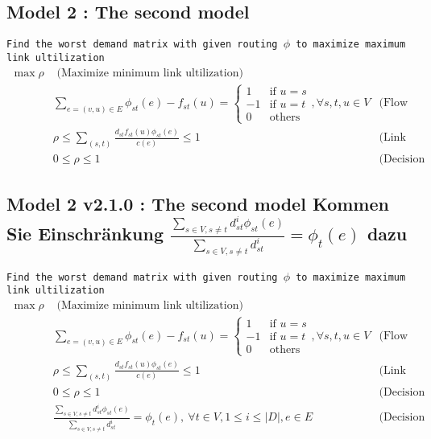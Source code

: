 \documentclass{ctexart}
\begin{document}
\subsection{Model 2 : The second model}
\texttt{Find the worst demand matrix with given routing $\phi$  to maximize maximum link ultilization} 
\begin{equation}
	\begin{aligned}
		\max \rho & \text{  (Maximize minimum link ultilization)}\\
		& \sum_{e=(v,u)\in E}\phi_{st}(e)-f_{st}(u)=\begin{cases}
			1 &\text{if } u=s \\
			-1 &\text{if } u=t \\
			0 &\text{others} 
		 \end{cases},\forall s,t,u\in V & \text{(Flow conservation)}\\
		& \rho\leq\sum_{(s,t)}\frac{
			d_{st}f_{st}(u)\phi_{st}(e)}{c(e)} \leq 1\ &  \text{(Link capacity constraint)} \\
		& 0\leq\rho\leq1\ & \text{(Decision variable constraint)}
	\end{aligned}
\end{equation}

\subsection{Model 2 v2.1.0 : The second model Kommen Sie Einschränkung $\frac{\sum_{s\in V,s\not=t}d_{st}^i\phi_{st}(e)}{\sum_{s\in V,s\not=t}d_{st}^i}=\phi_t(e)$ dazu}
\texttt{Find the worst demand matrix with given routing $\phi$  to maximize maximum link ultilization} 
\begin{equation}
	\begin{aligned}
		\max \rho & \text{  (Maximize minimum link ultilization)}\\
		& \sum_{e=(v,u)\in E}\phi_{st}(e)-f_{st}(u)=\begin{cases}
			1 &\text{if } u=s \\
			-1 &\text{if } u=t \\
			0 &\text{others} 
		 \end{cases},\forall s,t,u\in V & \text{(Flow conservation)}\\
		& \rho\leq\sum_{(s,t)}\frac{
			d_{st}f_{st}(u)\phi_{st}(e)}{c(e)} \leq 1\ &  \text{(Link capacity constraint)} \\
		& 0\leq\rho\leq1\ & \text{(Decision variable constraint)}\\
		& \frac{\sum_{s\in V,s\not=t}d_{st}^i\phi_{st}(e)}{\sum_{s\in V,s\not=t}d_{st}^i}=\phi_t(e), \ \forall t\in V,1\leq i \leq |\textit{D}|, e\in E & \text{(Decision variable constraint)}
	\end{aligned}
\end{equation}
\end{document}
